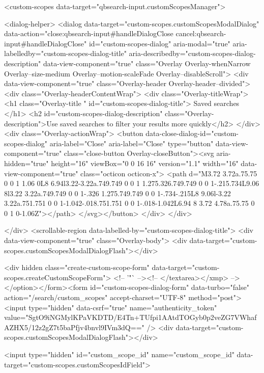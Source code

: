     <custom-scopes data-target="qbsearch-input.customScopesManager">
    
<dialog-helper>
  <dialog data-target="custom-scopes.customScopesModalDialog" data-action="close:qbsearch-input#handleDialogClose cancel:qbsearch-input#handleDialogClose" id="custom-scopes-dialog" aria-modal="true" aria-labelledby="custom-scopes-dialog-title" aria-describedby="custom-scopes-dialog-description" data-view-component="true" class="Overlay Overlay-whenNarrow Overlay--size-medium Overlay--motion-scaleFade Overlay--disableScroll">
    <div data-view-component="true" class="Overlay-header Overlay-header--divided">
  <div class="Overlay-headerContentWrap">
    <div class="Overlay-titleWrap">
      <h1 class="Overlay-title " id="custom-scopes-dialog-title">
        Saved searches
      </h1>
        <h2 id="custom-scopes-dialog-description" class="Overlay-description">Use saved searches to filter your results more quickly</h2>
    </div>
    <div class="Overlay-actionWrap">
      <button data-close-dialog-id="custom-scopes-dialog" aria-label="Close" aria-label="Close" type="button" data-view-component="true" class="close-button Overlay-closeButton"><svg aria-hidden="true" height="16" viewBox="0 0 16 16" version="1.1" width="16" data-view-component="true" class="octicon octicon-x">
    <path d="M3.72 3.72a.75.75 0 0 1 1.06 0L8 6.94l3.22-3.22a.749.749 0 0 1 1.275.326.749.749 0 0 1-.215.734L9.06 8l3.22 3.22a.749.749 0 0 1-.326 1.275.749.749 0 0 1-.734-.215L8 9.06l-3.22 3.22a.751.751 0 0 1-1.042-.018.751.751 0 0 1-.018-1.042L6.94 8 3.72 4.78a.75.75 0 0 1 0-1.06Z"></path>
</svg></button>
    </div>
  </div>
  
</div>
      <scrollable-region data-labelled-by="custom-scopes-dialog-title">
        <div data-view-component="true" class="Overlay-body">        <div data-target="custom-scopes.customScopesModalDialogFlash"></div>

        <div hidden class="create-custom-scope-form" data-target="custom-scopes.createCustomScopeForm">
        <!-- '"` --><!-- </textarea></xmp> --></option></form><form id="custom-scopes-dialog-form" data-turbo="false" action="/search/custom_scopes" accept-charset="UTF-8" method="post"><input type="hidden" data-csrf="true" name="authenticity_token" value="SgtO9iNGMylKPaVKDTD/E4Tn+TUfpi1AAtdTOGyb0p2veZG7VWhafAZHX5/12z2gZ7t5baPfjv4bnvl9IVm3dQ==" />
          <div data-target="custom-scopes.customScopesModalDialogFlash"></div>

          <input type="hidden" id="custom_scope_id" name="custom_scope_id" data-target="custom-scopes.customScopesIdField">

